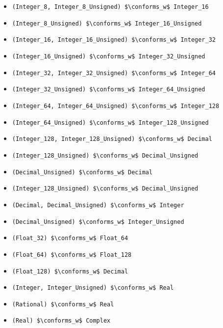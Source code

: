 \begin{itemize}
\item \lstinline!(Integer_8, Integer_8_Unsigned) $\conforms_w$ Integer_16!
\item \lstinline!(Integer_8_Unsigned) $\conforms_w$ Integer_16_Unsigned!

\item \lstinline!(Integer_16, Integer_16_Unsigned) $\conforms_w$ Integer_32!
\item \lstinline!(Integer_16_Unsigned) $\conforms_w$ Integer_32_Unsigned!

\item \lstinline!(Integer_32, Integer_32_Unsigned) $\conforms_w$ Integer_64!
\item \lstinline!(Integer_32_Unsigned) $\conforms_w$ Integer_64_Unsigned!

\item \lstinline!(Integer_64, Integer_64_Unsigned) $\conforms_w$ Integer_128!
\item \lstinline!(Integer_64_Unsigned) $\conforms_w$ Integer_128_Unsigned!

\item \lstinline!(Integer_128, Integer_128_Unsigned) $\conforms_w$ Decimal!
\item \lstinline!(Integer_128_Unsigned) $\conforms_w$ Decimal_Unsigned!

\item \lstinline!(Decimal_Unsigned) $\conforms_w$ Decimal!
\item \lstinline!(Integer_128_Unsigned) $\conforms_w$ Decimal_Unsigned!

\item \lstinline!(Decimal, Decimal_Unsigned) $\conforms_w$ Integer!
\item \lstinline!(Decimal_Unsigned) $\conforms_w$ Integer_Unsigned!

\item \lstinline!(Float_32) $\conforms_w$ Float_64!
\item \lstinline!(Float_64) $\conforms_w$ Float_128!
\item \lstinline!(Float_128) $\conforms_w$ Decimal!

\item \lstinline!(Integer, Integer_Unsigned) $\conforms_w$ Real!
\item \lstinline!(Rational) $\conforms_w$ Real!
\item \lstinline!(Real) $\conforms_w$ Complex!
\end{itemize}

